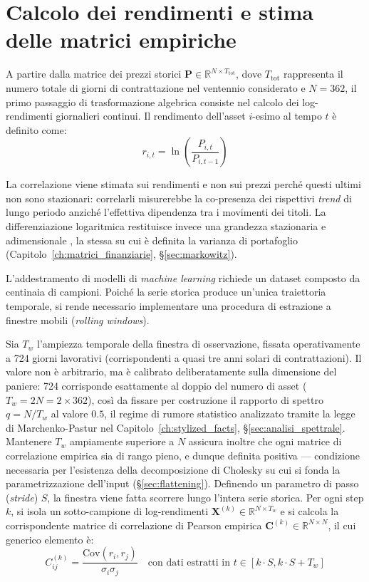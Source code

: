 \section{Calcolo dei rendimenti e stima delle matrici empiriche}
\label{sec:rendimenti_finestre}

A partire dalla matrice dei prezzi storici $\mathbf{P} \in \mathbb{R}^{N \times T_{\text{tot}}}$, dove $T_{\text{tot}}$ rappresenta il numero totale di giorni di contrattazione nel ventennio considerato e $N=362$, il primo passaggio di trasformazione algebrica consiste nel calcolo dei log-rendimenti giornalieri continui. Il rendimento dell'asset $i$-esimo al tempo $t$ è definito come:
\begin{equation}
r_{i,t} = \ln \left( \frac{P_{i,t}}{P_{i,t-1}} \right)
\end{equation}

La correlazione viene stimata sui rendimenti e non sui prezzi perché questi ultimi non sono stazionari: correlarli misurerebbe la co-presenza dei rispettivi \emph{trend} di lungo periodo anziché l'effettiva dipendenza tra i movimenti dei titoli. La differenziazione logaritmica restituisce invece una grandezza stazionaria e adimensionale \citep{cont2001stylizedfacts}, la stessa su cui è definita la varianza di portafoglio (Capitolo~\ref{ch:matrici_finanziarie}, \S\ref{sec:markowitz}).

L'addestramento di modelli di \emph{machine learning} richiede un dataset composto da centinaia di campioni. Poiché la serie storica produce un'unica traiettoria temporale, si rende necessario implementare una procedura di estrazione a finestre mobili (\emph{rolling windows}).

Sia $T_w$ l'ampiezza temporale della finestra di osservazione, fissata operativamente a 724 giorni lavorativi (corrispondenti a quasi tre anni solari di contrattazioni). Il valore non è arbitrario, ma è calibrato deliberatamente sulla dimensione del paniere: 724 corrisponde esattamente al doppio del numero di asset ($T_w = 2N = 2 \times 362$), così da fissare per costruzione il rapporto di spettro $q = N/T_w$ al valore $0.5$, il regime di rumore statistico analizzato tramite la legge di Marchenko-Pastur nel Capitolo~\ref{ch:stylized_facts}, \S\ref{sec:analisi_spettrale}. Mantenere $T_w$ ampiamente superiore a $N$ assicura inoltre che ogni matrice di correlazione empirica sia di rango pieno, e dunque definita positiva --- condizione necessaria per l'esistenza della decomposizione di Cholesky su cui si fonda la parametrizzazione dell'input (\S\ref{sec:flattening}). Definendo un parametro di passo (\emph{stride}) $S$, la finestra viene fatta scorrere lungo l'intera serie storica. Per ogni step $k$, si isola un sotto-campione di log-rendimenti $\mathbf{X}^{(k)} \in \mathbb{R}^{N \times T_w}$ e si calcola la corrispondente matrice di correlazione di Pearson empirica $\mathbf{C}^{(k)} \in \mathbb{R}^{N \times N}$, il cui generico elemento è:
\begin{equation}
C_{ij}^{(k)} = \frac{\text{Cov}(r_i, r_j)}{\sigma_i \sigma_j} \quad \text{con dati estratti in } t \in [k \cdot S, k \cdot S + T_w]
\end{equation}

